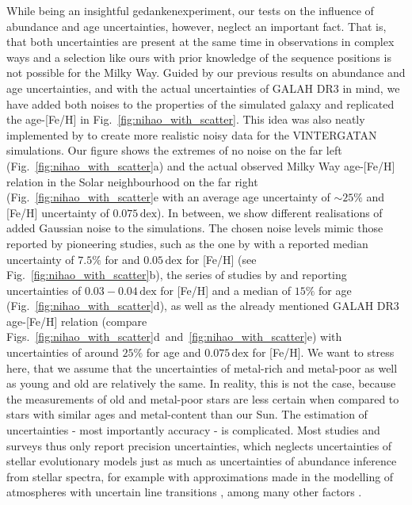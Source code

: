 \documentclass[fleqn,usenatbib]{mnras}
\begin{document}
While being an insightful gedankenexperiment, our tests on the influence of abundance and age uncertainties, however, neglect an important fact. That is, that both uncertainties are present at the same time in observations in complex ways and a selection like ours with prior knowledge of the sequence positions is not possible for the Milky Way. Guided by our previous results on abundance and age uncertainties, and with the actual uncertainties of GALAH DR3 in mind, we have added both noises to the properties of the simulated galaxy and replicated the age-[Fe/H] in Fig.~\ref{fig:nihao_with_scatter}. This idea was also neatly implemented by \citet[][see their Fig.~12]{Renaud2021} to create more realistic noisy data for the \textsc{VINTERGATAN} simulations. Our figure shows the extremes of no noise on the far left (Fig.~\ref{fig:nihao_with_scatter}a) and the actual observed Milky Way age-[Fe/H] relation in the Solar neighbourhood on the far right (Fig.~\ref{fig:nihao_with_scatter}e with an average age uncertainty of $\sim 25\%$ and [Fe/H] uncertainty of $0.075\,\mathrm{dex}$). In between, we show different realisations of added Gaussian noise to the simulations. The chosen noise levels mimic those reported by pioneering studies, such as the one by \citet{Xiang2022} with a reported median uncertainty of $7.5\%$ for and $0.05\,\mathrm{dex}$ for [Fe/H] (see Fig.~\ref{fig:nihao_with_scatter}b), the series of studies by \citet{Nissen2010} and \citet{Schuster2012} reporting uncertainties of $0.03-0.04\,\mathrm{dex}$ for [Fe/H] and a median of $15\%$ for age (Fig.~\ref{fig:nihao_with_scatter}d), as well as the already mentioned GALAH DR3 age-[Fe/H] relation (compare Figs.~\ref{fig:nihao_with_scatter}d~and~\ref{fig:nihao_with_scatter}e) with uncertainties of around $25\%$ for age and $0.075\,\mathrm{dex}$ for [Fe/H]. We want to stress here, that we assume that the uncertainties of metal-rich and metal-poor as well as young and old are relatively the same. In reality, this is not the case, because the measurements of old and metal-poor stars are less certain \citep{Frebel2015} when compared to stars with similar ages and metal-content than our Sun. The estimation of uncertainties - most importantly accuracy - is complicated. Most studies and surveys thus only report precision uncertainties, which neglects uncertainties of stellar evolutionary models \citep{Soderblom2010} just as much as uncertainties of abundance inference from stellar spectra, for example with approximations made in the modelling of atmospheres with uncertain line transitions \citep{Mihalas1973, Asplund2005}, among many other factors \citep{Jofre2017, Jofre2018, Nissen2018}.
\end{document}
